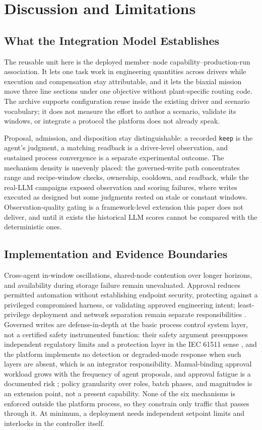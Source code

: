 \section{Discussion and Limitations}
\label{sec:limits}
\subsection{What the Integration Model Establishes}
The reusable unit here is the deployed member--node capability--production-run
association. It lets one task work in engineering quantities across drivers while
execution and compensation stay attributable, and it lets the biaxial mission move
three line sections under one objective without plant-specific routing code. The
archive supports configuration reuse inside the existing driver and scenario
vocabulary; it does not measure the effort to author a scenario, validate its
windows, or integrate a protocol the platform does not already speak.

Proposal, admission, and disposition stay distinguishable: a recorded
\texttt{keep} is the agent's judgment, a matching
readback is a driver-level observation, and sustained process convergence is a
separate experimental outcome. The mechanism density is unevenly placed: the
governed-write path concentrates range and recipe-window checks, ownership,
cooldown, and readback, while the real-LLM campaigns exposed observation and
scoring failures, where writes executed as designed but some judgments rested on
stale or constant windows. Observation-quality gating is a framework-level
extension this paper does not deliver, and until it exists the historical LLM
scores cannot be compared with the deterministic ones.

\subsection{Implementation and Evidence Boundaries}
Cross-agent in-window oscillations, shared-node
contention over longer horizons, and availability during storage failure remain
unevaluated. Approval reduces permitted automation without establishing endpoint security,
protecting against a privileged compromised harness, or validating approved
engineering intent; least-privilege deployment and network separation remain
separate responsibilities \cite{iec62443,nist80082}. Governed writes are
defense-in-depth at the basic process control system layer, not a certified safety
instrumented function: their safety argument presupposes independent regulatory
limits and a protection layer in the IEC 61511 sense \cite{iec61511}, and the
platform implements no detection or degraded-mode response when such layers are
absent, which is an integrator responsibility. Manual-binding approval workload
grows with the frequency of agent proposals, and approval fatigue is a documented
risk \cite{parasuraman2000model,bainbridge1983ironies}; policy granularity over
roles, batch phases, and magnitudes is an extension point, not a present
capability. None of the six mechanisms is enforced outside the platform process, so
they constrain only traffic that passes through it. At minimum, a deployment needs
independent setpoint limits and interlocks in the controller itself.

